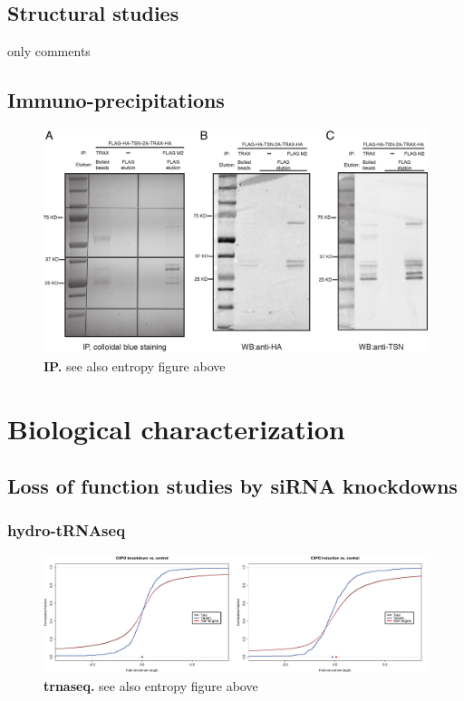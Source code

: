 \documentclass[12pt]{rockefeller}
\begin{document}
\subsection{Structural studies}
only comments

\subsection{Immuno-precipitations}

\begin{figure}[!ht]%
\centering
\includegraphics[width=\textwidth]{IP.png} 
\caption[IP.]
{
\textbf{IP.}
see also entropy figure above
}
\centering
\label{motifs}%
\end{figure}


\section{Biological characterization}

  \subsection{Loss of function studies by siRNA knockdowns}

      \subsubsection{hydro-tRNAseq}

\begin{figure}[!ht]%
\centering
\includegraphics[width=\textwidth]{trnaseq.png} 
\caption[trnaseq.]
{
\textbf{trnaseq.}
see also entropy figure above
}
\centering
\label{motifs}%
\end{figure}
\end{document}
